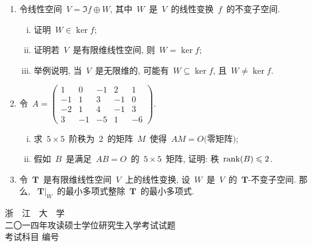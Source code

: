 \documentclass[UTF8,a4paper,11pt]{article}
\begin{document}
\begin{enumerate}
	      \vspace{2em}
	\item 令线性空间~$V=\Im f\oplus W$, 其中~$W$~是~$V$~的线性变换~$f$~的不变子空间.
	      \begin{enumerate}[(i)]
		      \item 证明~$W\in \ker f$;
		      \item 证明若~$V$~是有限维线性空间, 则~$W=\ker f$;
		      \item 举例说明, 当~$V$~是无限维的, 可能有~$W\subseteq \ker f$, 且~$W\neq\ker f$.
	      \end{enumerate}
	      \vspace{2em}
	\item 令~$A=\begin{pmatrix} 1 & 0 & -1 & 2 & 1\\ -1 & 1 & 3 & -1 & 0\\ -2 & 1 & 4 & -1 & 3\\ 3 & -1 & -5 & 1 & -6\end{pmatrix}.$
	      \begin{enumerate}[(i)]
		      \item 求~$5\times 5$~阶秩为~$2$~的矩阵~$M$~使得~$AM=O\text{(零矩阵)}$;
		      \item 假如~$B$~是满足~$AB=O$~的~$5\times 5$~矩阵, 证明: 秩~$\mathrm{rank}(B)\leqslant 2$.
	      \end{enumerate}
	      \vspace{2em}
	\item 令~$\mathbf{T}$~是有限维线性空间~$V$~上的线性变换, 设~$W$~是~$V$~的~$\mathbf{T}$-不变子空间. 那么, ~$\left.\mathbf{T}\right|_W$~的最小多项式整除~$\mathbf{T}$~的最小多项式.
	      \vspace{2em}
\end{enumerate}

\newpage
\setcounter{page}{1}

\begin{center}
	{\Huge 浙~~江~~大~~学}\\
	\setlength{\parskip}{5pt}
	{\Large 二〇一四年攻读硕士学位研究生入学考试试题}\\
	\setlength{\parskip}{10 pt}
	{\Large 考试科目\underline{} 编号\underline{}}
\end{center}
\end{document}
